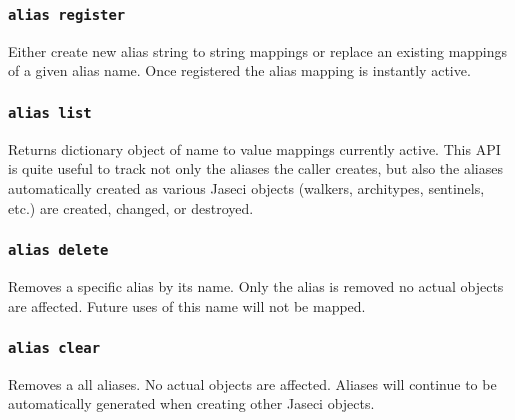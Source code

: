 \subsubsection{\lstinline[basicstyle=\Large\ttfamily]$alias register$}

{Either create new alias string to string mappings or replace
an existing mappings of a given alias name. Once registered the
alias mapping is instantly active.\vspace{4mm}\par
{}}
\subsubsection{\lstinline[basicstyle=\Large\ttfamily]$alias list$}

{Returns dictionary object of name to value mappings currently active.
This API is quite useful to track not only the aliases the caller
creates, but also the aliases automatically created as various Jaseci
objects (walkers, architypes, sentinels, etc.) are created, changed,
or destroyed.}
\subsubsection{\lstinline[basicstyle=\Large\ttfamily]$alias delete$}

{Removes a specific alias by its name. Only the alias is removed no
actual objects are affected. Future uses of this name will not be
mapped.\vspace{4mm}\par
{}}
\subsubsection{\lstinline[basicstyle=\Large\ttfamily]$alias clear$}

{Removes a all aliases. No actual objects are affected. Aliases will
continue to be automatically generated when creating other Jaseci
objects.}
